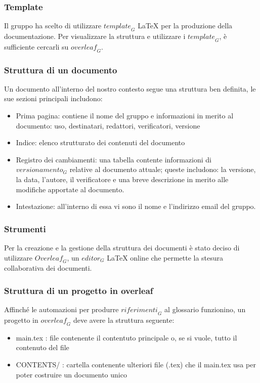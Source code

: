 \subsubsection{Template}
Il gruppo ha scelto di utilizzare $\textit{template}_G$ LaTeX per la produzione della documentazione. Per visualizzare la struttura e utilizzare i $\textit{template}_G$, è sufficiente cercarli su $\textit{overleaf}_G$.

\subsubsection{Struttura di un documento}
Un documento all'interno del nostro contesto segue una struttura ben definita, le sue sezioni principali includono:
\begin{itemize}
    \item Prima pagina: contiene il nome del gruppo e informazioni in merito al documento: uso, destinatari, redattori, verificatori, versione
    \item Indice: elenco strutturato dei contenuti del documento
    \item Registro dei cambiamenti: una tabella contente informazioni di $\textit{versionamento}_G$ relative al documento attuale; queste includono: la versione, la data, l'autore, il verificatore e una breve descrizione in merito alle modifiche apportate al documento.
    \item Intestazione: all'interno di essa vi sono il nome e l'indirizzo email del gruppo.
\end{itemize}

\subsubsection{Strumenti}
Per la creazione e la gestione della struttura dei documenti è stato deciso di utilizzare $\textit{Overleaf}_G$, un $\textit{editor}_G$ LaTeX online che permette la stesura collaborativa dei documenti.

\subsubsection{Struttura di un progetto in overleaf}
Affinché le automazioni per produrre $\textit{riferimenti}_G$ al glossario funzionino, un progetto in $\textit{overleaf}_G$ deve avere la struttura seguente:

\begin{itemize}
    \item main.tex : file contenente il contentuto principale o, se si vuole, tutto il contenuto del file
    \item CONTENTS/ : cartella contenente ulteriori file (.tex) che il main.tex usa per poter costruire un documento unico
\end{itemize}


